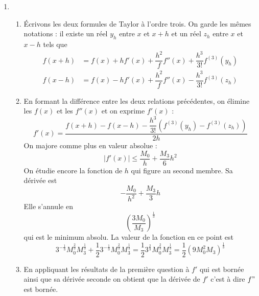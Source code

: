 \begin{enumerate}
\item \begin{enumerate}
 \item \'Ecrivons les deux formules de Taylor à l'ordre trois. On garde les mêmes notations : il existe un réel $y_h$ entre $x$ et $x+h$ et un réel $z_h$ entre $x$ et $x-h$ tels que
\begin{align*}
 f(x+h) &= f(x) + h f'(x) +\dfrac{h^2}{f}f''(x) +\dfrac{h^3}{3!}f^{(3)}(y_h) \\ 
f(x-h) &= f(x) - h f'(x) +\dfrac{h^2}{f}f''(x) -\dfrac{h^3}{3!}f^{(3)}(z_h) 
\end{align*}
\item En formant la différence entre les deux relations précédentes, on élimine les $f(x)$ et les $f''(x)$ et on exprime $f'(x)$ :
\begin{displaymath}
 f'(x) = \dfrac{f(x+h)-f(x-h)-\dfrac{h^3}{3!}(f^{(3)}(y_h)-f^{(3)}(z_h))}{2h}
\end{displaymath}
On majore comme plus en valeur absolue :
\begin{displaymath}
 |f'(x)|\leq \dfrac{M_0}{h} + \dfrac{M_3}{6}h^2
\end{displaymath}
On étudie encore la fonction de $h$ qui figure au second membre. Sa dérivée est
\begin{displaymath}
 -\dfrac{M_0}{h^2}+\dfrac{M_3}{3}h
\end{displaymath}
Elle s'annule en
\begin{displaymath}
 \left( \dfrac{3M_0}{M_3}\right)^{\frac{1}{3}} 
\end{displaymath}
qui est le minimum absolu. La valeur de la fonction en ce point est 
\begin{displaymath}
 3^{-\frac{1}{3}}M_0^{\frac{2}{3}}M_3^{\frac{1}{3}}+\dfrac{1}{2}3^{-\frac{1}{3}}M_0^{\frac{2}{3}}M_3^{\frac{1}{3}}
= \dfrac{1}{2}3^{\frac{2}{3}}M_0^{\frac{2}{3}}M_3^{\frac{1}{3}}
=\dfrac{1}{2}\left( 9M_0^2M_3\right)^{\frac{1}{3}} 
\end{displaymath}
\item En appliquant les résultats de la première question à $f'$ qui est bornée ainsi que sa dérivée seconde on obtient que la dérivée de $f'$ c'est à dire $f"$ est bornée.
\end{enumerate}
\end{enumerate}

